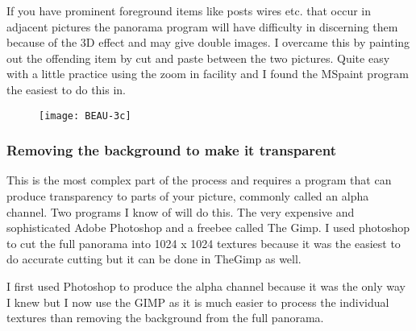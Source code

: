 If you have prominent foreground items like posts wires etc. that occur
in adjacent pictures the panorama program will have difficulty in
discerning them because of the 3D effect and may give double images. I
overcame this by painting out the offending item by cut and paste
between the two pictures. Quite easy with a little practice using the
zoom in facility and I found the MSpaint program the easiest to do this
in.

\begin{figure}[h]
\centering\texttt{[image: BEAU-3c]}
\end{figure}

\subsubsection{Removing the background to make it
transparent}\label{removing-the-background-to-make-it-transparent}

This is the most complex part of the process and requires a program that
can produce transparency to parts of your picture, commonly called an
alpha channel. Two programs I know of will do this. The very expensive
and sophisticated Adobe Photoshop and a freebee called The Gimp. I used
photoshop to cut the full panorama into 1024 x 1024 textures because it
was the easiest to do accurate cutting but it can be done in TheGimp as
well.

I first used Photoshop to produce the alpha channel because it was the
only way I knew but I now use the GIMP as it is much easier to process
the individual textures than removing the background from the full
panorama.


